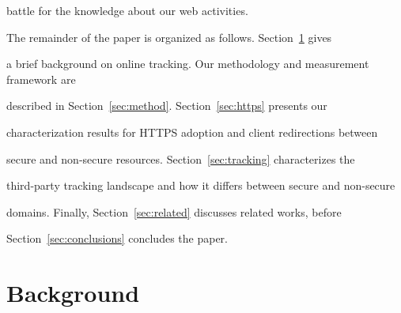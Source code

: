 \documentclass{sig-alternate-10pt}
\begin{document}
battle for the knowledge about our web activities.



The remainder of the paper is organized as follows. Section~\ref{sec:background} gives 

a brief background on online tracking.  Our methodology and measurement framework are 

described in Section~\ref{sec:method}.  Section~\ref{sec:https} presents our 

characterization results for HTTPS adoption and client redirections between 

secure and non-secure resources.  Section~\ref{sec:tracking} characterizes the 

third-party tracking landscape and how it differs between secure and non-secure 

domains. Finally, Section~\ref{sec:related} discusses related works, before 

Section~\ref{sec:conclusions} concludes the paper.





\section{Background}\label{sec:background}








\end{document}
